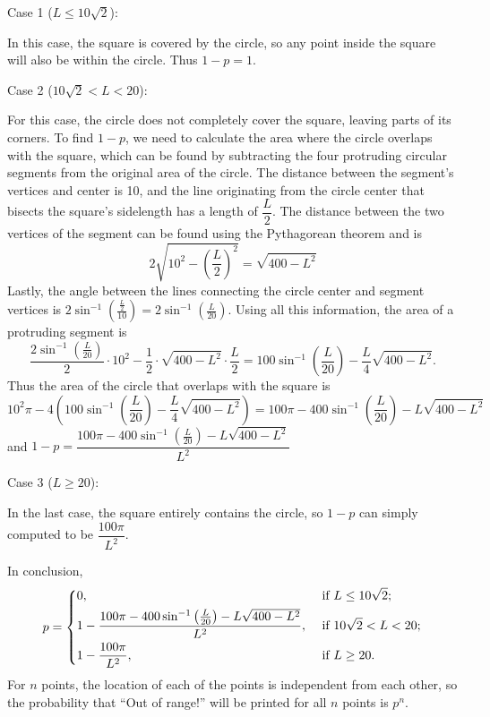 \documentclass{assignment-263}
\begin{document}
\begin{enumerate}
\begin{enumerate}
    \smallskip

    Case 1 (\(L \leq 10\sqrt{2}\)):

    In this case, the square is covered by the circle, so any point inside the square will also be within the circle. Thus \(1 - p = 1\).

    \smallskip

    Case 2 (\(10\sqrt{2} < L < 20\)):

    For this case, the circle does not completely cover the square, leaving parts of its corners. To find \(1 - p\), we need to calculate the area where the circle overlaps with the square, which can be found by subtracting the four protruding circular segments from the original area of the circle. The distance between the segment's vertices and center is 10, and the line originating from the circle center that bisects the square's sidelength has a length of \(\dfrac{L}{2}\). The distance between the two vertices of the segment can be found using the Pythagorean theorem and is
    \[
      2\sqrt{10^2 - \left( \frac{L}{2} \right)^2} = \sqrt{400 - L^2}
    \]
    Lastly, the angle between the lines connecting the circle center and segment vertices is \(2\sin ^{-1}\left( \frac{\frac{L}{2}}{10} \right) = 2\sin^{-1} \left( \frac{L}{20} \right)\). Using all this information, the area of a protruding segment is
    \[
      \frac{2\sin^{-1}\left( \frac{L}{20} \right)}{2}\cdot 10^2 - \frac{1}{2} \cdot \sqrt{400 - L^2} \cdot \frac{L}{2} = 100\sin^{-1} \left( \frac{L}{20} \right) - \frac{L}{4}\sqrt{400 - L^2}.
    \]
    Thus the area of the circle that overlaps with the square is
    \[
      10^2 \pi - 4\left( 100\sin^{-1} \left( \frac{L}{20} \right) - \frac{L}{4}\sqrt{400 - L^2} \right) = 100\pi - 400\sin^{-1}\left( \frac{L}{20} \right) - L\sqrt{400 - L^2}
    \]
    and \(1 - p = \dfrac{100\pi - 400\sin^{-1}\left( \frac{L}{20} \right) - L\sqrt{400 - L^2}}{L^2}\) 

    \smallskip

    Case 3 (\(L \geq 20\)):

    In the last case, the square entirely contains the circle, so \(1 - p\) can simply computed to be \(\dfrac{100\pi}{L^2}\).

    In conclusion,
    \[
      p = \begin{dcases}
        0, &\text{ if } L \leq 10\sqrt{2} ;\\
        1 - \dfrac{100\pi - 400\sin^{-1}\left( \frac{L}{20} \right) - L\sqrt{400 - L^2}}{L^2}, &\text{ if } 10\sqrt{2} < L < 20 ;\\
        1 - \dfrac{100\pi}{L^2}, &\text{ if } L \geq 20.
      \end{dcases}
    \]
    For \(n\) points, the location of each of the points is independent from each other, so the probability that ``Out of range!'' will be printed for all \(n\) points is \(p^n\).
    

\end{enumerate}
\end{enumerate}
\end{document}
